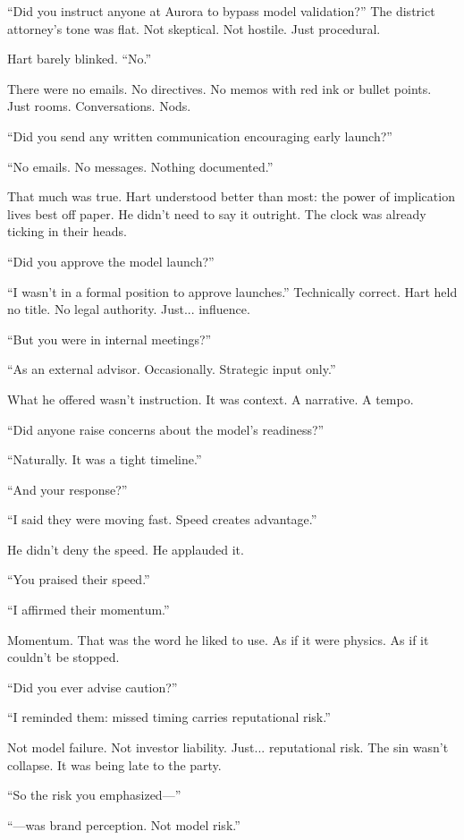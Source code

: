   \medskip

“Did you instruct anyone at Aurora to bypass model validation?”
The district attorney's tone was flat. Not skeptical. Not hostile. Just procedural.

Hart barely blinked.
“No.”

There were no emails. No directives. No memos with red ink or bullet points.
Just rooms. Conversations. Nods.

“Did you send any written communication encouraging early launch?”

“No emails. No messages. Nothing documented.”

That much was true. Hart understood better than most: the power of implication lives best off paper.
He didn’t need to say it outright. The clock was already ticking in their heads.

“Did you approve the model launch?”

“I wasn’t in a formal position to approve launches.”
Technically correct. Hart held no title. No legal authority. Just... influence.

“But you were in internal meetings?”

“As an external advisor. Occasionally. Strategic input only.”

What he offered wasn’t instruction. It was context.
A narrative.
A tempo.

“Did anyone raise concerns about the model’s readiness?”

“Naturally. It was a tight timeline.”

“And your response?”

“I said they were moving fast. Speed creates advantage.”

He didn’t deny the speed.
He applauded it.

“You praised their speed.”

“I affirmed their momentum.”

Momentum. That was the word he liked to use. As if it were physics.
As if it couldn’t be stopped.

“Did you ever advise caution?”

“I reminded them: missed timing carries reputational risk.”

Not model failure. Not investor liability.
Just... reputational risk. The sin wasn’t collapse. It was being late to the party.

“So the risk you emphasized—”

“—was brand perception. Not model risk.”

